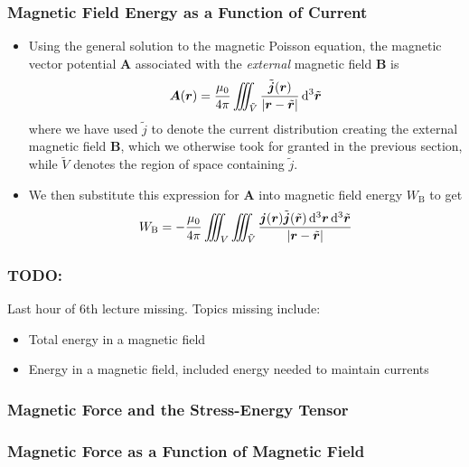 \documentclass[11pt, a4paper]{article}
\newcommand{\diff}{\mathop{}\!\mathrm{d}} %
\newcommand{\dr}{\diff^{3} \r}  %
\newcommand{\dtr}{\diff^{3} \tilde{\r}}  %
\renewcommand{\vec}[1]{\bm{#1}} %
\renewcommand{\t}[1]{\tilde{#1}} %
\renewcommand{\r}{\vec{r}}
\newcommand{\B}{\vec{B}} %
\newcommand{\A}{\vec{A}} %
\newcommand{\mm}{\mu_{0}}  %
\renewcommand{\j}{\vec{j}}  %
\begin{document}
\subsubsection{Magnetic Field Energy as a Function of Current}
\begin{itemize}
	\item Using the general solution to the magnetic Poisson equation, the magnetic vector potential $ \A $ associated with the \textit{external} magnetic field $ \B $ is
	\begin{equation*}
		\A(\r) = \frac{\mm}{4\pi}\iiint_{\tilde{V}}\frac{\t{\j}(\r)}{\abs{\r - \t{\r}}} \dtr
	\end{equation*}
    where we have used $ \tilde{j} $ to denote the current distribution creating the external magnetic field $ \B $, which we otherwise took for granted in the previous section, while $ \tilde{V} $ denotes the region of space containing $ \tilde{j} $.

    \item We then substitute this expression for $ \A $ into magnetic field energy $ W_{\mathrm{B}} $ to get
	\begin{equation*}
		W_{\mathrm{B}} = - \frac{\mm}{4\pi} \iiint_{V} \iiint_{\t{V}} \frac{\j(\r) \t{\j}(\t{\r}) \dr \dtr}{\abs{\r - \t{\r}}}
	\end{equation*}
\end{itemize}

\subsubsection{TODO:} Last hour of 6th lecture missing. Topics missing include:
\begin{itemize}
	\item Total energy in a magnetic field
	\item Energy in a magnetic field, included energy needed to maintain currents
	
\end{itemize}


\subsubsection{Magnetic Force and the Stress-Energy Tensor}

\subsubsection{Magnetic Force as a Function of Magnetic Field}
\end{document}
